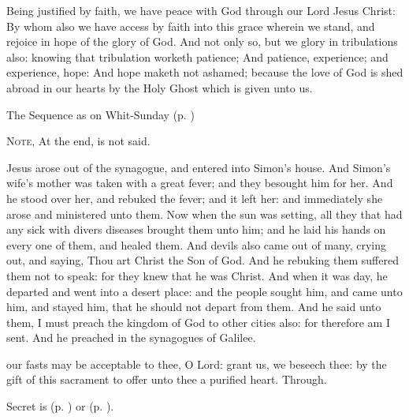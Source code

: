  Being justified by faith, we have peace with God through our Lord Jesus Christ: By whom also we have access by faith into this grace wherein we stand, and rejoice in hope of the glory of God. And not only so, but we glory in tribulations also: knowing that tribulation worketh patience; And patience, experience; and experience, hope: And hope maketh not ashamed; because the love of God is shed abroad in our hearts by the Holy Ghost which is given unto us.


\begin{rubric}
{The Sequence as on Whit-Sunday (p. \pageref{WhitSeq})}
\end{rubric}

\begin{rubric}
    \textsc{Note,} At the end,  is not said.
\end{rubric}

 Jesus arose out of the synagogue, and entered into Simon's house. And Simon's wife's mother was taken with a great fever; and they besought him for her. And he stood over her, and rebuked the fever; and it left her: and immediately she arose and ministered unto them. Now when the sun was setting, all they that had any sick with divers diseases brought them unto him; and he laid his hands on every one of them, and healed them. And devils also came out of many, crying out, and saying, Thou art Christ the Son of God. And he rebuking them suffered them not to speak: for they knew that he was Christ. And when it was day, he departed and went into a desert place: and the people sought him, and came unto him, and stayed him, that he should not depart from them. And he said unto them, I must preach the kingdom of God to other cities also: for therefore am I sent. And he preached in the synagogues of Galilee.


\secret
{} our fasts may be acceptable to thee, O Lord: grant us, we beseech thee: by the gift of this sacrament to offer unto thee a purified heart. Through.
\begin{rubric}
     Secret is  (p. \pageref{SPAgainst}) or  (p. \pageref{SPChiefBishop}).
\end{rubric}

